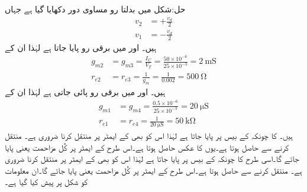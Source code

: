 حل:شکل  میں بدلتا رو مساوی دور دکھایا گیا ہے جہاں
\begin{align*}
v_2&=+\frac{v_d}{2}\\
v_1&=-\frac{v_d}{2}
\end{align*}
ہیں۔ اور   میں  برقی رو پایا جاتا ہے لہٰذا ان کے
\begin{align*}
g_{m2}&=g_{m3}=\frac{I_C}{V_T}=\frac{50 \times 10^{-6}}{25 \times 10^{-3}}=\SI{2}{\milli \siemens}\\
r_{e2}&=r_{e3} = \frac{1}{g_m}=\frac{1}{0.002}=\SI{500}{\ohm}
\end{align*}
ہیں۔ اور  میں  برقی رو پائی جاتی ہے لہٰذا ان کے
\begin{align*}
g_{m1}&=g_{m4}=\frac{0.5 \times 10^{-6}}{25 \times 10^{-3}}=\SI{20}{\micro \siemens}\\
r_{e1}&=r_{e4}=\frac{1}{\SI{20}{\micro \siemens}}=\SI{50}{\kilo \ohm}
\end{align*}
ہیں۔ کا  چونکہ  کے بیس پر پایا جاتا ہے لہٰذا اس کو بھی   کے ایمٹر پر منتقل کرنا ضروری ہے۔ منتقل کرنے سے  حاصل ہوتا ہے۔یوں  کا عکس  حاصل ہوتا ہے۔اس طرح   کے ایمٹر پر کُل مزاحمت  یعنی   پایا جائے گا۔اسی طرح  کا  چونکہ  کے بیس پر پایا جاتا ہے لہٰذا اس کو بھی   کے ایمٹر پر منتقل کرنا ضروری ہے۔ منتقل کرنے سے  حاصل ہوتا ہے۔اس طرح   کے ایمٹر پر کُل مزاحمت  یعنی   پایا جائے گا۔ان معلومات کو شکل  پر پیش کیا گیا ہے۔

